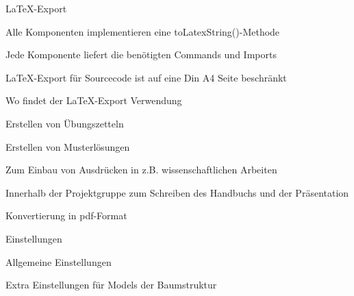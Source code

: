 {
  \begin{itemgroup}{\LaTeX-Export}
    \item Alle Komponenten implementieren eine toLatexString()-Methode
    \item Jede Komponente liefert die benötigten Commands und Imports
    \item \LaTeX-Export für Sourcecode ist auf eine Din A4 Seite beschränkt

  \end{itemgroup}
}

{
  \begin{itemgroup}{Wo findet der \LaTeX-Export Verwendung}
    \item Erstellen von Übungszetteln
    \item Erstellen von Musterlösungen
    \item Zum Einbau von Ausdrücken in z.B. wissenschaftlichen Arbeiten
    \item Innerhalb der Projektgruppe zum Schreiben des Handbuchs und der Präsentation
    \item Konvertierung in pdf-Format
  \end{itemgroup}
}

{
  \begin{itemgroup}{Einstellungen}
    \item Allgemeine Einstellungen
    \item Extra Einstellungen für Models der Baumstruktur

  \end{itemgroup}
}